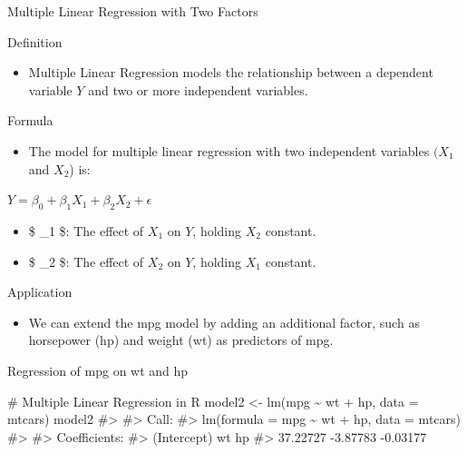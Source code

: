 \documentclass[
  18 pt,
  ignorenonframetext,
  aspectratio=1610,
]{beamer}
\newenvironment{Shaded}{\begin{snugshade}}{\end{snugshade}}
\newcommand{\AttributeTok}[1]{\textcolor[rgb]{0.40,0.45,0.13}{#1}}
\newcommand{\CommentTok}[1]{\textcolor[rgb]{0.37,0.37,0.37}{#1}}
\newcommand{\FunctionTok}[1]{\textcolor[rgb]{0.28,0.35,0.67}{#1}}
\newcommand{\NormalTok}[1]{\textcolor[rgb]{0.00,0.23,0.31}{#1}}
\newcommand{\OtherTok}[1]{\textcolor[rgb]{0.00,0.23,0.31}{#1}}
\newcommand{\SpecialCharTok}[1]{\textcolor[rgb]{0.37,0.37,0.37}{#1}}
\providecommand{\tightlist}{%
  \setlength{\itemsep}{0pt}\setlength{\parskip}{0pt}}\usepackage{longtable,booktabs,array}
\begin{document}
\begin{frame}{Multiple Linear Regression with Two Factors}
\protect\hypertarget{multiple-linear-regression-with-two-factors}{}
\begin{block}{Definition}
\protect\hypertarget{definition-1}{}
\begin{itemize}
\tightlist
\item
  Multiple Linear Regression models the relationship between a dependent
  variable \(Y\) and two or more independent variables.
\end{itemize}
\end{block}

\begin{block}{Formula}
\protect\hypertarget{formula-1}{}
\begin{itemize}
\tightlist
\item
  The model for multiple linear regression with two independent
  variables \((X_1\) and \(X_2\)) is:
\end{itemize}

\(Y = \beta_0 + \beta_1 X_1 + \beta_2 X_2 + \epsilon\)

\begin{itemize}
\tightlist
\item
  \$ \beta\_1 \$: The effect of \(X_1\) on \(Y\), holding \(X_2\)
  constant.
\item
  \$ \beta\_2 \$: The effect of \(X_2\) on \(Y\), holding \(X_1\)
  constant.
\end{itemize}
\end{block}

\begin{block}{Application}
\protect\hypertarget{application-1}{}
\begin{itemize}
\tightlist
\item
  We can extend the mpg model by adding an additional factor, such as
  horsepower (hp) and weight (wt) as predictors of mpg.
\end{itemize}
\end{block}
\end{frame}

\begin{frame}[fragile]{Regression of mpg on wt and hp}
\protect\hypertarget{regression-of-mpg-on-wt-and-hp}{}
\begin{Shaded}
\begin{Highlighting}[]
\CommentTok{\# Multiple Linear Regression in R}
\NormalTok{model2 }\OtherTok{\textless{}{-}} \FunctionTok{lm}\NormalTok{(mpg }\SpecialCharTok{\textasciitilde{}}\NormalTok{ wt }\SpecialCharTok{+}\NormalTok{ hp, }\AttributeTok{data =}\NormalTok{ mtcars)}
\NormalTok{model2}
\CommentTok{\#\textgreater{} }
\CommentTok{\#\textgreater{} Call:}
\CommentTok{\#\textgreater{} lm(formula = mpg \textasciitilde{} wt + hp, data = mtcars)}
\CommentTok{\#\textgreater{} }
\CommentTok{\#\textgreater{} Coefficients:}
\CommentTok{\#\textgreater{} (Intercept)           wt           hp  }
\CommentTok{\#\textgreater{}    37.22727     {-}3.87783     {-}0.03177}
\end{Highlighting}
\end{Shaded}

\normalsize
\end{frame}
\end{document}
